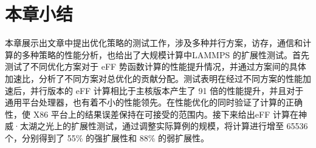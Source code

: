 \section{本章小结}
本章展示出文章中提出优化策略的测试工作，涉及多种并行方案，访存，通信和计算的多种策略的性能分析，也给出了大规模计算中LAMMPS 的扩展性测试。首先测试了不同优化方案对于 eFF 势函数计算的性能提升情况，并通过方案间的具体加速比，分析了不同方案对总优化的贡献分配。测试表明在经过不同方案的性能加速后，并行版本的 eFF 计算相比于主核版本产生了 91 倍的性能提升，并且对于通用平台处理器，也有着不小的性能领先。在性能优化的同时验证了计算的正确性，使 X86 平台上的结果误差保持在可接受的范围内。接下来给出eFF 计算在神威·太湖之光上的扩展性测试，通过调整实际算例的规模，将计算进行增至 65536 个，分别得到了 55\% 的强扩展性和 88\% 的弱扩展性。
